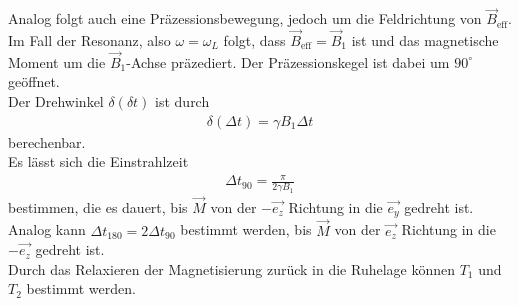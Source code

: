 \documentclass[]{scrartcl}
\begin{document}
Analog folgt auch eine Präzessionsbewegung, jedoch um die Feldrichtung von $\vec{B}_{\text{eff}}$.\\
Im Fall der Resonanz, also $\omega=\omega_L$ folgt, dass $\vec{B}_{\text{eff}}=\vec{B}_1$ ist und das magnetische Moment um die $\vec{B}_1$-Achse präzediert. Der Präzessionskegel ist dabei um $90^\circ$ geöffnet.\\
Der Drehwinkel $\delta\left(\delta t\right)$ ist durch
\begin{align}
\delta\left(\Delta t\right)=\gamma B_1 \Delta t
\end{align}
berechenbar.\\
Es lässt sich die Einstrahlzeit 
\begin{align}
\Delta t_{90}=\frac{\pi}{2\gamma B_1} 
\end{align}
bestimmen, die es dauert, bis $\vec{M}$ von der $-\vec{e_z}$ Richtung in die  $\vec{e_y}$ gedreht ist.\\
Analog kann $\Delta t_{180}=2 \Delta t_{90}$ bestimmt werden, bis $\vec{M}$ von der $\vec{e_z}$ Richtung in die  $-\vec{e_z}$ gedreht ist.\\ 
Durch das Relaxieren der Magnetisierung zurück in die Ruhelage können $T_1$ und $T_2$ bestimmt werden.
\end{document}
